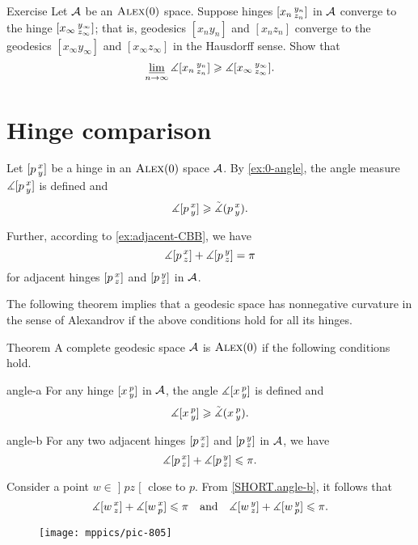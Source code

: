\begin{thm}{Exercise}\label{ex:angle-lim}
Let $\mathcal{A}$ be an $\textsc{Alex}(0)$ space.
Suppose hinges $[x_n\,{}^{y_n}_{z_n}]$ in $\mathcal{A}$ converge to the hinge $[x_\infty\,{}^{y_\infty}_{z_\infty}]$;
that is, geodesics $[x_ny_n]$ and $[x_nz_n]$ converge to the geodesics $[x_\infty y_\infty]$ and $[x_\infty z_\infty]$ in the Hausdorff sense.
Show that 
\[\varliminf_{n\to\infty}\measuredangle [x_n\,{}^{y_n}_{z_n}]\geqslant \measuredangle [x_\infty\,{}^{y_\infty}_{z_\infty}].\]
\end{thm}

\section{Hinge comparison}

Let $[p\,{}^{x}_{y}]$ be a hinge in an $\textsc{Alex}(0)$ space $\mathcal{A}$.
By \ref{ex:0-angle}, the angle measure $\measuredangle[p\,{}^{x}_{y}]$ is defined and
\[\measuredangle[p\,{}^{x}_{y}]\geqslant \tilde\measuredangle(p\,{}^{x}_{y}).\]

Further, according to \ref{ex:adjacent-CBB}, we have 
\[\measuredangle[p\,{}^{x}_{z}]+\measuredangle[p\,{}^{y}_{z}]=\pi\]
for adjacent hinges $[p\,{}^{x}_{z}]$ and $[p\,{}^{y}_{z}]$ in $\mathcal{A}$.

The following theorem implies that a geodesic space has nonnegative curvature in the sense of Alexandrov if
the above conditions hold for all its hinges.

\begin{thm}{Theorem}\label{thm:angle-cbb}
A complete geodesic space $\mathcal{A}$ is $\textsc{Alex}(0)$ if the following conditions hold.

\begin{subthm}{angle-a}
For any hinge $[x\,{}^{p}_{y}]$ in $\mathcal{A}$, the angle 
$\measuredangle[x\,{}^{p}_{y}]$ is defined and 
\[\measuredangle[x\,{}^{p}_{y}]\geqslant\tilde\measuredangle(x\,{}^{p}_{y}).\]
\end{subthm}

\begin{subthm}{angle-b}
For any two adjacent hinges $[p\,{}^{x}_{z}]$ and $[p\,{}^{y}_{z}]$ in $\mathcal{A}$, we have
\[\measuredangle[p\,{}^{x}_{z}]+\measuredangle[p\,{}^{y}_{z}]\leqslant\pi.\]
\end{subthm}

\end{thm}

Consider a point  $w\in \mathopen{]} p z \mathclose{[}$ close to $p$.
From \ref{SHORT.angle-b}, it follows that 
\[\measuredangle[w\,{}^{x}_{z}]+ \measuredangle[w\,{}^{x}_{p}]\leqslant\pi\quad \text{and}\quad \measuredangle[w\,{}^{y}_{z}] + \measuredangle[w\,{}^{y}_{p}]\leqslant\pi.\]

\begin{wrapfigure}{o}{30 mm}
\vskip-0mm
\centering
\texttt{[image: mppics/pic-805]}
\vskip4mm
\end{wrapfigure}

